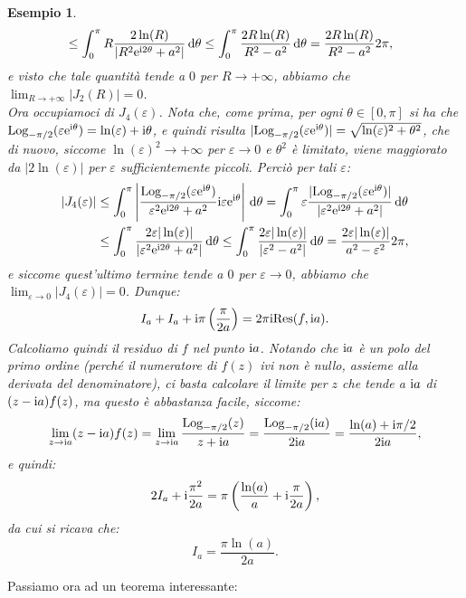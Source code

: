 \documentclass[11pt]{book}
\theoremstyle{Definizione}
\theoremstyle{TeoremaProposizioneLemmaCorollarioCongettura}
\theoremstyle{OsservazioneNotaEsempio}
\newtheorem{myes}{Esempio}[section]
\renewcommand{\i}{\textup{i}}
\newcommand{\e}{\textup{e}}
\renewcommand{\d}{\mathrm{d}}
\newcommand{\dtheta}{\, \d \theta}
\newcommand{\Res}{\textup{Res}}
\newcommand{\Log}[1][]{\textup{Log}_{#1}}
\begin{document}
\begin{myes}
\begin{align*}
&\leq \int_{0}^{\pi} R \frac{2\ln(R)}{|R^2\e^{\i2\theta}+a^2|}\dtheta \leq \int_0^\pi \frac{2R\ln(R)}{R^2-a^2}\dtheta = \frac{2R\ln(R)}{R^2-a^2} 2\pi,
\end{align*}
e visto che tale quantità tende a $0$ per $R \to +\infty$, abbiamo che $\lim_{R \to +\infty} |J_2(R)| = 0$.\\
Ora occupiamoci di $J_4(\varepsilon)$. Nota che, come prima, per ogni $\theta\in [0,\pi]$ si ha che $\Log[-\pi/2](\varepsilon\e^{\i\theta}) = \ln(\varepsilon) + \i\theta$, e quindi risulta $|\Log[-\pi/2](\varepsilon \e^{\i\theta}) | = \sqrt{\ln(\varepsilon)^2+\theta^2}$, che di nuovo, siccome $\ln(\varepsilon)^2 \to +\infty$ per $\varepsilon \to 0$ e $\theta^2$ è limitato, viene maggiorato da $|2\ln(\varepsilon)|$ per $\varepsilon$ sufficientemente piccoli. Perciò per tali $\varepsilon$:
\begin{align*}
|J_4(\varepsilon)| &\leq \int_{0}^{\pi}\left|\frac{\Log[-\pi/2](\varepsilon\e^{\i\theta})}{\varepsilon^2\e^{\i 2\theta}+a^2}\i\varepsilon\e^{\i\theta}\right|\dtheta = \int_{0}^{\pi} \varepsilon\frac{|\Log[-\pi/2](\varepsilon\e^{\i\theta})|}{|\varepsilon^2\e^{\i 2\theta}+a^2|}\dtheta \\
&\leq \int_{0}^\pi \frac{2\varepsilon|\ln(\varepsilon)|}{|\varepsilon^2\e^{\i 2\theta}+a^2|} \dtheta \leq \int_0^\pi \frac{2\varepsilon|\ln(\varepsilon)|}{|\varepsilon^2-a^2|}\dtheta = \frac{2\varepsilon|\ln(\varepsilon)|}{a^2-\varepsilon^2}2\pi,
\end{align*}
e siccome quest'ultimo termine tende a $0$ per $\varepsilon \to 0$, abbiamo che $\lim_{\varepsilon \to 0} |J_4(\varepsilon)| = 0$.
Dunque:
$$
I_a+I_a+\i\pi\left(\frac{\pi}{2a}\right) = 2\pi\i \Res(f,\i a).
$$
Calcoliamo quindi il residuo di $f$ nel punto $\i a$. Notando che $\i a$ è un polo del primo ordine (perché il numeratore di $f(z)$ ivi non è nullo, assieme alla derivata del denominatore), ci basta calcolare il limite per $z$ che tende a $\i a$ di $(z-\i a) f(z)$, ma questo è abbastanza facile, siccome:
$$
\lim_{z \to \i a} (z-\i a) f(z) = \lim_{z \to \i a} \frac{\Log[-\pi/2](z)}{z+\i a} = \frac{\Log[-\pi/2](\i a)}{2\i a} = \frac{\ln(a)+\i\pi/2}{2\i a},
$$
e quindi:
$$
2I_a + \i \frac{\pi^2}{2a} = \pi \left(\frac{\ln(a)}{a}+\i\frac{\pi}{2a}\right),
$$
da cui si ricava che:
$$
I_a = \frac{\pi \ln(a)}{2a}.
$$
\end{myes}
Passiamo ora ad un teorema interessante:
\end{document}
